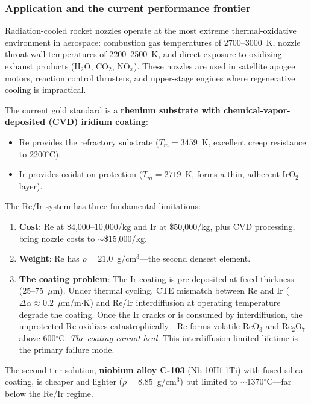 \documentclass[12pt,letterpaper]{article}
\theoremstyle{definition}
\begin{document}
\subsubsection{Application and the current performance frontier}

Radiation-cooled rocket nozzles operate at the most extreme thermal-oxidative environment in aerospace: combustion gas temperatures of 2700--3000~K, nozzle throat wall temperatures of 2200--2500~K, and direct exposure to oxidizing exhaust products (H$_2$O, CO$_2$, NO$_x$).  These nozzles are used in satellite apogee motors, reaction control thrusters, and upper-stage engines where regenerative cooling is impractical.

The current gold standard is a \textbf{rhenium substrate with chemical-vapor-deposited (CVD) iridium coating}:
\begin{itemize}
  \item Re provides the refractory substrate ($T_m = 3459$~K, excellent creep resistance to 2200$^\circ$C).
  \item Ir provides oxidation protection ($T_m = 2719$~K, forms a thin, adherent IrO$_2$ layer).
\end{itemize}

The Re/Ir system has three fundamental limitations:

\begin{enumerate}
  \item \textbf{Cost}: Re at \$4,000--10,000/kg and Ir at \$50,000/kg, plus CVD processing, bring nozzle costs to $\sim$\$15,000/kg.
  \item \textbf{Weight}: Re has $\rho = 21.0$~g/cm$^3$---the second densest element.
  \item \textbf{The coating problem}: The Ir coating is pre-deposited at fixed thickness (25--75~$\mu$m).  Under thermal cycling, CTE mismatch between Re and Ir ($\Delta\alpha \approx 0.2$~$\mu$m/m$\cdot$K) and Re/Ir interdiffusion at operating temperature degrade the coating.  Once the Ir cracks or is consumed by interdiffusion, the unprotected Re oxidizes catastrophically---Re forms volatile ReO$_3$ and Re$_2$O$_7$ above 600$^\circ$C.  \emph{The coating cannot heal.}  This interdiffusion-limited lifetime is the primary failure mode.
\end{enumerate}

The second-tier solution, \textbf{niobium alloy C-103} (Nb-10Hf-1Ti) with fused silica coating, is cheaper and lighter ($\rho = 8.85$~g/cm$^3$) but limited to $\sim$1370$^\circ$C---far below the Re/Ir regime.
\end{document}
